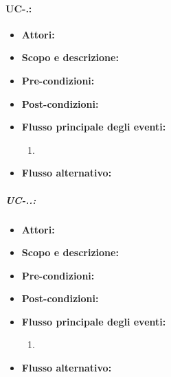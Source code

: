 
\paragraph{UC-.: } %

\begin{itemize}
	\item \textbf{Attori:} 
	\item \textbf{Scopo e descrizione:} 
	\item \textbf{Pre-condizioni:} 
	\item \textbf{Post-condizioni:} 
	\item \textbf{Flusso principale degli eventi:}
		\begin{enumerate}
			\item 
		\end{enumerate}
	\item \textbf{Flusso alternativo:} 
\end{itemize}

\subparagraph{UC-..: } %

\begin{itemize}
	\item \textbf{Attori:} 
	\item \textbf{Scopo e descrizione:} 
	\item \textbf{Pre-condizioni:} 
	\item \textbf{Post-condizioni:} 
	\item \textbf{Flusso principale degli eventi:}
		\begin{enumerate}
			\item 
		\end{enumerate}
	\item \textbf{Flusso alternativo:} 
\end{itemize}